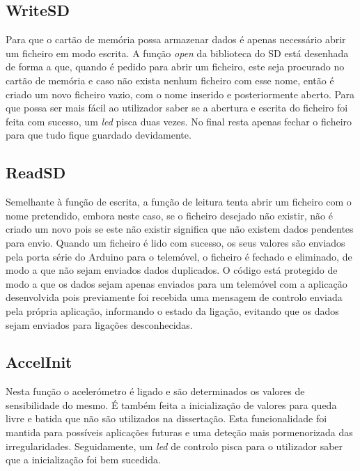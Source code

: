 \subsection{WriteSD}
\label{sub:writesd}

Para que o cartão de memória possa armazenar dados é apenas necessário abrir um ficheiro em modo escrita.
A função \emph{open} da biblioteca do SD está desenhada de forma a que, quando é pedido para abrir um ficheiro, este seja procurado no cartão de memória e caso não exista nenhum ficheiro com esse nome, então é criado um novo ficheiro vazio, com o nome inserido e posteriormente aberto.
Para que possa ser mais fácil ao utilizador saber se a abertura e escrita do ficheiro foi feita com sucesso, um \emph{led} pisca duas vezes.
No final resta apenas fechar o ficheiro para que tudo fique guardado devidamente.

\subsection{ReadSD}
\label{sub:readsd}

Semelhante à função de escrita, a função de leitura tenta abrir um ficheiro com o nome pretendido, embora neste caso, se o ficheiro desejado não existir, não é criado um novo pois se este não existir significa que não existem dados pendentes para envio.
Quando um ficheiro é lido com sucesso, os seus valores são enviados pela porta série do Arduino para o telemóvel, o ficheiro é fechado e eliminado, de modo a que não sejam enviados dados duplicados.
O código está protegido de modo a que os dados sejam apenas enviados para um telemóvel com a aplicação desenvolvida pois previamente foi recebida uma mensagem de controlo enviada pela própria aplicação, informando o estado da ligação, evitando que os dados sejam enviados para ligações desconhecidas.

\subsection{AccelInit}
\label{sub:accelInit}

Nesta função o acelerómetro é ligado e são determinados os valores de sensibilidade do mesmo.
É também feita a inicialização de valores para queda livre e batida que não são utilizados na dissertação.
Esta funcionalidade foi mantida para possíveis aplicações futuras e uma deteção mais pormenorizada das irregularidades.
Seguidamente, um \emph{led} de controlo pisca para o utilizador saber que a inicialização foi bem sucedida.

